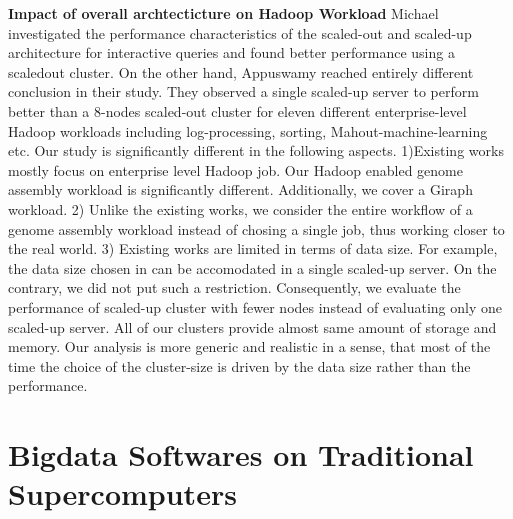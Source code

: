 \documentclass[conference]{IEEEtran}
\begin{document}
\textbf{Impact of overall archtecticture on Hadoop Workload}
Michael \cite{scaleupscaleout:michael} investigated the performance characteristics of the scaled-out and scaled-up architecture for interactive queries and found better performance using a scaledout cluster.
On the other hand, Appuswamy \cite{scaleupscaleout:appuswamy} reached entirely different conclusion in their study. 
They observed a single scaled-up server to perform better than a 8-nodes scaled-out cluster for eleven different enterprise-level Hadoop workloads including log-processing, sorting, Mahout-machine-learning etc.
Our study is significantly different in the following aspects.
1)Existing works mostly focus on enterprise level Hadoop job. Our Hadoop enabled genome assembly workload is significantly different. Additionally, we cover a Giraph workload.
2) Unlike the existing works, we consider the entire workflow of a genome assembly workload instead of chosing a single job, thus working closer to the real world. 
3) Existing works are limited in terms of data size. For example, the data size chosen in \cite{scaleupscaleout:appuswamy} can be accomodated in a single scaled-up server. On the contrary, we did not put such a restriction. Consequently, we evaluate the performance of scaled-up cluster with fewer nodes instead of evaluating only one scaled-up server. All of our clusters provide almost same amount of storage and memory. Our analysis is more generic and realistic in a sense, that most of the time the choice of the cluster-size is driven by the data size rather than the performance.



\section {Bigdata Softwares on Traditional Supercomputers} \label{Bigdata Softwares on Traditional Supercomputers}
\end{document}
